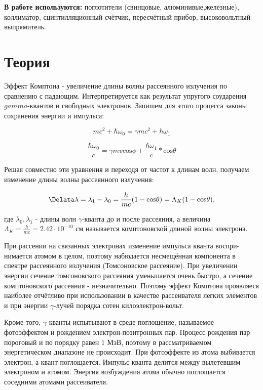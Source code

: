 \documentclass[14pt,a4paper]{scrartcl}
\begin{document}
\quad  \textbf{В работе используются:} поглотители (свинцовые, алюминивые,железные), коллиматор, сцинтилляционный счётчик, пересчётный прибор, высоковольтный выпрямитель.

\section{Теория}
\quad  Эффект Комптона - увеличение длины волны рассеянного излучения по сравнению с падающим. Интерпретируется как результат упругого соударения $gamma$-квантов и свободных электронов. Запишем для этого процесса законы сохранения энергии и импульса:

\begin{equation}
    mc^2 + \hbar \omega_0 = \gamma mc^2 + \hbar \omega_1
\end{equation}


\begin{equation}
    \frac{\hbar \omega_0}{c} = \gamma mv \mathrm{cos}\phi + \frac{\hbar \omega_1}{c} * \mathrm{cos} \theta
\end{equation}

Решая совместно эти уравнения и переходя от частот к длинам волн, получаем
изменение длины волны рассеянного излучения:

\begin{equation}
    \Delata \lambda = \lambda_1 - \lambda_0 = \frac{h}{mc}(1-\mathrm{cos}\theta) = \Lambda_K (1-\mathrm{cos}\theta) ,
\end{equation}

где $\lambda_0, \lambda_1 $ - длины волн $\gamma$-кванта до и после рассеяния, а величина $\Lambda_K = \frac{h}{mc} = 2.42 \cdot  10 ^{−10}$ см называется комптоновской длиной волны электрона.

\quad При рассении на связанных электронах изменение импульса кванта воспри-
нимается атомом в целом, поэтому набюдается несмещённая компонента в спектре
рассеянного излучения (Томсоновское рассеяние). При увеличении энергии сечение
томсоновского рассеяния уменьшается очень быстро, а сечение комптоновского рассеяния - незначительно. Поэтому эффект Комптона проявляеся наиболее отчётливо
при использовании в качестве рассеивателя легких элементов и при энергии $\gamma$-лучей порядка сотен килоэлектрон-вольт.

\qaud Кроме того, $\gamma$-кванты испытывают в среде поглощение, называемое фотоэффектом и рождением электрон-позитронных пар. Процесс рождения пар пороговый
и по порядку равен 1 МэВ, поэтому в рассматриваемом энергетическом диапазоне
не происходит. При фотоэффекте из атома выбивается электрон, а квант поглощается. Импульс кванта делится между вылетевшим электроном и атомом. Энергия
возбуждения атома обычно поглощается соседними атомами рассеивателя.
\end{document}
